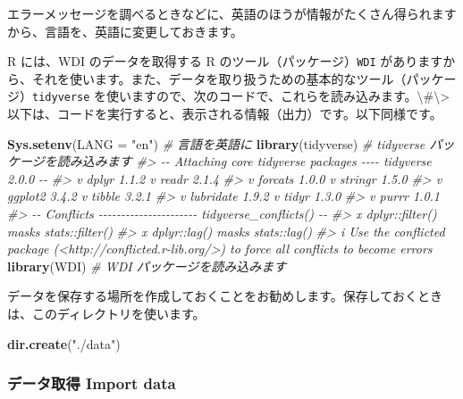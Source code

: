 \documentclass[
  xelatex, ja=standard]{bxjsbook}
\newenvironment{Shaded}{\begin{snugshade}}{\end{snugshade}}
\newcommand{\AttributeTok}[1]{\textcolor[rgb]{0.13,0.29,0.53}{#1}}
\newcommand{\CommentTok}[1]{\textcolor[rgb]{0.56,0.35,0.01}{\textit{#1}}}
\newcommand{\FunctionTok}[1]{\textcolor[rgb]{0.13,0.29,0.53}{\textbf{#1}}}
\newcommand{\NormalTok}[1]{#1}
\newcommand{\StringTok}[1]{\textcolor[rgb]{0.31,0.60,0.02}{#1}}
\theoremstyle{definition}
\theoremstyle{definition}
\theoremstyle{definition}
\theoremstyle{definition}
\theoremstyle{remark}
\begin{document}
エラーメッセージを調べるときなどに、英語のほうが情報がたくさん得られますから、言語を、英語に変更しておきます。

R には、WDI のデータを取得する R のツール（パッケージ）\texttt{WDI} がありますから、それを使います。また、データを取り扱うための基本的なツール（パッケージ）\texttt{tidyverse} を使いますので、次のコードで、これらを読み込みます。\textbackslash\#\textbackslash\textgreater{} 以下は、コードを実行すると、表示される情報（出力）です。以下同様です。

\begin{Shaded}
\begin{Highlighting}[]
\FunctionTok{Sys.setenv}\NormalTok{(}\AttributeTok{LANG =} \StringTok{"en"}\NormalTok{) }\CommentTok{\# 言語を英語に}
\FunctionTok{library}\NormalTok{(tidyverse)      }\CommentTok{\# tidyverse パッケージを読み込みます}
\CommentTok{\#\textgreater{} {-}{-} Attaching core tidyverse packages {-}{-}{-}{-} tidyverse 2.0.0 {-}{-}}
\CommentTok{\#\textgreater{} v dplyr     1.1.2     v readr     2.1.4}
\CommentTok{\#\textgreater{} v forcats   1.0.0     v stringr   1.5.0}
\CommentTok{\#\textgreater{} v ggplot2   3.4.2     v tibble    3.2.1}
\CommentTok{\#\textgreater{} v lubridate 1.9.2     v tidyr     1.3.0}
\CommentTok{\#\textgreater{} v purrr     1.0.1     }
\CommentTok{\#\textgreater{} {-}{-} Conflicts {-}{-}{-}{-}{-}{-}{-}{-}{-}{-}{-}{-}{-}{-}{-}{-}{-}{-}{-}{-}{-}{-} tidyverse\_conflicts() {-}{-}}
\CommentTok{\#\textgreater{} x dplyr::filter() masks stats::filter()}
\CommentTok{\#\textgreater{} x dplyr::lag()    masks stats::lag()}
\CommentTok{\#\textgreater{} i Use the conflicted package (\textless{}http://conflicted.r{-}lib.org/\textgreater{}) to force all conflicts to become errors}
\FunctionTok{library}\NormalTok{(WDI)            }\CommentTok{\# WDI パッケージを読み込みます}
\end{Highlighting}
\end{Shaded}

データを保存する場所を作成しておくことをお勧めします。保存しておくときは、このディレクトリを使います。

\begin{Shaded}
\begin{Highlighting}[]
\FunctionTok{dir.create}\NormalTok{(}\StringTok{"./data"}\NormalTok{)}
\end{Highlighting}
\end{Shaded}

\hypertarget{ux30c7ux30fcux30bfux53d6ux5f97-import-data-1}{%
\subsubsection{データ取得 Import data}\label{ux30c7ux30fcux30bfux53d6ux5f97-import-data-1}}
\end{document}
